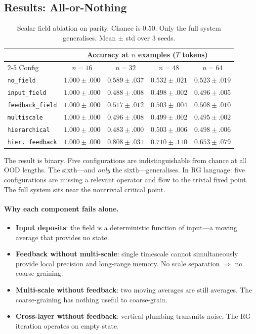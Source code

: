 \documentclass[11pt,a4paper]{article}
\begin{document}
\subsection{Results: All-or-Nothing}

\begin{table}[h]
\centering
\caption{Scalar field ablation on parity.  Chance is 0.50.
  Only the full system generalises.  Mean $\pm$ std over 3 seeds.}
\label{tab:scalar-results}
\begin{tabular}{@{}l cccc@{}}
\toprule
& \multicolumn{4}{c}{Accuracy at $n$ examples ($T$ tokens)} \\
\cmidrule(l){2-5}
Config & $n{=}16$ & $n{=}32$ & $n{=}48$ & $n{=}64$ \\
\midrule
\texttt{no\_field}        & $1.000 \pm .000$ & $0.589 \pm .037$ & $0.532 \pm .021$ & $0.523 \pm .019$ \\
\texttt{input\_field}     & $1.000 \pm .000$ & $0.488 \pm .008$ & $0.498 \pm .002$ & $0.496 \pm .005$ \\
\texttt{feedback\_field}  & $1.000 \pm .000$ & $0.517 \pm .012$ & $0.503 \pm .004$ & $0.508 \pm .010$ \\
\texttt{multiscale}       & $1.000 \pm .000$ & $0.496 \pm .008$ & $0.499 \pm .002$ & $0.495 \pm .002$ \\
\texttt{hierarchical}     & $1.000 \pm .000$ & $0.483 \pm .000$ & $0.503 \pm .006$ & $0.498 \pm .006$ \\
\texttt{hier.\ feedback}  & $\mathbf{1.000 \pm .000}$ & $\mathbf{0.808 \pm .031}$ & $\mathbf{0.710 \pm .110}$ & $\mathbf{0.653 \pm .079}$ \\
\bottomrule
\end{tabular}
\end{table}

The result is binary.  Five configurations are indistinguishable from
chance at all OOD lengths.  The sixth---and \emph{only} the
sixth---generalises.  In RG language: five configurations are missing
a relevant operator and flow to the trivial fixed point.  The full
system sits near the nontrivial critical point.

\paragraph{Why each component fails alone.}
\begin{itemize}
  \item \textbf{Input deposits}: the field is a deterministic
    function of input---a moving average that provides no state.
  \item \textbf{Feedback without multi-scale}: single timescale
    cannot simultaneously provide local precision and long-range
    memory.  No scale separation $\Rightarrow$ no coarse-graining.
  \item \textbf{Multi-scale without feedback}: two moving averages
    are still averages.  The coarse-graining has nothing useful to
    coarse-grain.
  \item \textbf{Cross-layer without feedback}: vertical plumbing
    transmits noise.  The RG iteration operates on empty state.
\end{itemize}
\end{document}
